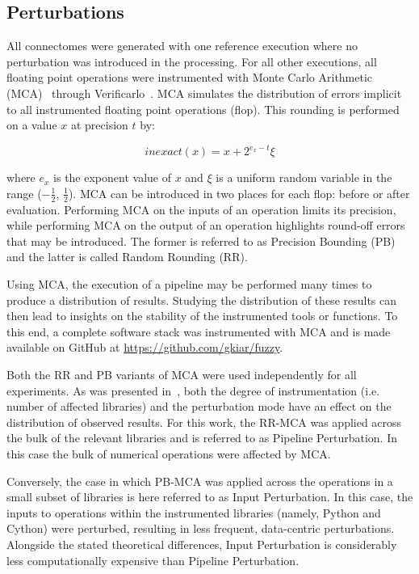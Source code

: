 \documentclass[fleqn,10pt]{SelfArx} %
\begin{document}
\subsection*{Perturbations}
All connectomes were generated with one reference execution where no perturbation was introduced in the processing. For
all other executions, all floating point operations were instrumented with Monte Carlo Arithmetic
(MCA)~\cite{Parker1997-qq} through Verificarlo~\cite{Denis2016-wo}. MCA simulates the distribution of errors implicit
to all instrumented floating point operations (flop). This rounding is performed on a value $x$ at precision $t$ by:

\begin{equation}
inexact(x) = x + 2^{e_x - t}\xi 
\label{eq:inexact}
\end{equation}

where $e_x$ is the exponent value of $x$ and $\xi$ is a uniform random variable in the range ($-\frac{1}{2}$,
$\frac{1}{2}$). MCA can be introduced in two places for each flop: before or after evaluation. Performing MCA on the
inputs of an operation limits its precision, while performing MCA on the output of an operation highlights round-off
errors that may be introduced. The former is referred to as Precision Bounding (PB) and the latter is called Random
Rounding (RR).

Using MCA, the execution of a pipeline may be performed many times to produce a distribution of results. Studying the
distribution of these results can then lead to insights on the stability of the instrumented tools or functions. To
this end, a complete software stack was instrumented with MCA and is made available on GitHub at
\url{https://github.com/gkiar/fuzzy}.

Both the RR and PB variants of MCA were used independently for all experiments. As was presented in~\cite{Kiar2020-lb},
both the degree of instrumentation (i.e. number of affected libraries) and the perturbation mode have an effect on the
distribution of observed results. For this work, the RR-MCA was applied across the bulk of the relevant libraries and
is referred to as Pipeline Perturbation. In this case the bulk of numerical operations were affected by MCA.

Conversely, the case in which PB-MCA was applied across the operations in a small subset of libraries is here referred
to as Input Perturbation. In this case, the inputs to operations within the instrumented libraries (namely, Python and
Cython) were perturbed, resulting in less frequent, data-centric perturbations. Alongside the stated theoretical
differences, Input Perturbation is considerably less computationally expensive than Pipeline Perturbation.
\end{document}
